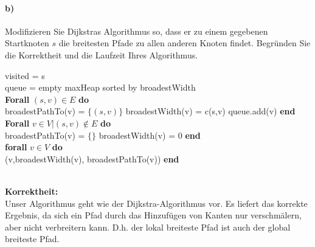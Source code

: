 \documentclass[paper=a4, fontsize=11pt]{scrartcl}
\numberwithin{equation}{section}
\numberwithin{figure}{section}
\numberwithin{table}{section}
\begin{document}
\paragraph{b)} 
Modifizieren Sie Dijkstras Algorithmus so, dass er zu einem gegebenen Startknoten $s$ die breitesten Pfade zu allen anderen Knoten findet. Begründen Sie die Korrektheit und die Laufzeit Ihres Algorithmus. \\

\begin{algorithm}[H]
\SetAlgoLined
visited = {s} \\
queue = empty maxHeap sorted by broadestWidth \\
\textbf{Forall} $(s,v) \in E$ \textbf{do} \\
broadestPathTo(v) = $\{(s,v) \}$ \;
broadestWidth(v) = c(s,v) \;
queue.add(v) \;
\textbf{end} \\
\textbf{Forall} $v \in V | (s,v) \notin E$ \textbf{do} \\
broadestPathTo(v) = $ \{ \}$ \;
broadestWidth(v) = 0 \;
\textbf{end} \\
\textbf{forall} $v \in V$ \textbf{do} \\
   \Return (v,broadestWidth(v), broadestPathTo(v)) \;
\textbf{end}   
\end{algorithm} \\

\textbf{Korrektheit:} \\
Unser Algorithmus geht wie der Dijkstra-Algorithmus vor. Es liefert das korrekte Ergebnis, da sich ein Pfad durch das Hinzufügen von Kanten nur verschmälern, aber nicht verbreitern kann. D.h. der lokal breiteste Pfad ist auch der global breiteste Pfad. \\
\end{document}
